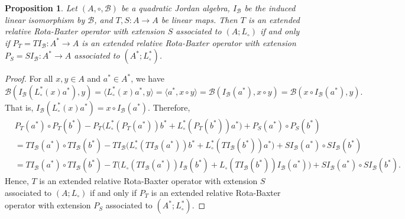 \documentclass[12pt, reqno, a4paper]{amsart}
\newtheorem{proposition}[theorem]{Proposition}
\theoremstyle{definition}
\begin{document}
\begin{proposition}\label{prop:ajo2s}
	Let $(A, \circ, \mathcal{B})$ be a quadratic Jordan algebra, $I_\mathcal{B}$ be the induced linear isomorphism by $\mathcal{B}$, and $T, S: A \to A$ be linear maps.
	Then $T$ is an extended relative Rota-Baxter operator with extension $S$ associated to $(A; L_{\circ})$ if and only if $P_T=T I_\mathcal{B}: A^* \to A$ is an extended relative Rota-Baxter operator with extension $P_S = S I_\mathcal{B}: A^* \to A$ associated to $(A^*; L_{\circ}^*)$.
\end{proposition}
\begin{proof}
	For all $x, y \in A$ and $a^* \in A^*$, we have
	\begin{equation*}
		\mathcal{B}(I_\mathcal{B}(L_{\circ}^*(x)a^*), y) = \langle L_{\circ}^*(x)a^*, y\rangle = \langle a^*, x \circ y\rangle = \mathcal{B}(I_\mathcal{B}(a^*), x \circ y) = \mathcal{B}(x \circ I_\mathcal{B}(a^*), y).
	\end{equation*}
	That is, $I_\mathcal{B}(L_{\circ}^*(x)a^*) = x \circ I_\mathcal{B}(a^*)$.
	Therefore,
	\begin{align*}
		 & P_T(a^*) \circ P_T(b^*) - P_T\big(L_{\circ}^*(P_T(a^*))b^* + L_{\circ}^*(P_T(b^*))a^* \big) + P_S(a^*) \circ P_S(b^*)                                                                                            \\
		 & =TI_\mathcal{B}(a^*) \circ TI_\mathcal{B}(b^*) - TI_\mathcal{B}\big(L_{\circ}^*(TI_\mathcal{B}(a^*))b^* + L_{\circ}^*(TI_\mathcal{B}(b^*))a^* \big) + SI_\mathcal{B}(a^*) \circ SI_\mathcal{B}(b^*)              \\
		 & = TI_\mathcal{B}(a^*) \circ TI_\mathcal{B}(b^*) - T\big(L_{\circ}(TI_\mathcal{B}(a^*))I_\mathcal{B}(b^*) + L_{\circ}(TI_\mathcal{B}(b^*))I_\mathcal{B}(a^*) \big) + SI_\mathcal{B}(a^*) \circ SI_\mathcal{B}(b^*).
	\end{align*}
	Hence, $T$ is an extended relative Rota-Baxter operator with extension $S$ associated to $(A; L_{\circ})$ if and only if $P_T$ is an extended relative Rota-Baxter operator with extension $P_S$ associated to $(A^*; L_{\circ}^*)$.
\end{proof}
\end{document}

